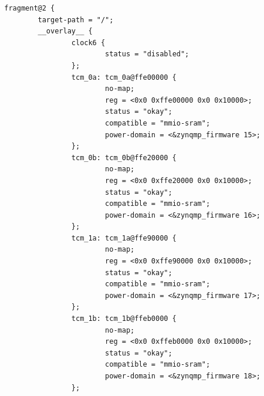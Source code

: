 \documentclass[10pt]{article}
\begin{document}
\begin{verbatim}
        fragment@2 {
                target-path = "/";
                __overlay__ {
                        clock6 {
                                status = "disabled";
                        };
                        tcm_0a: tcm_0a@ffe00000 {
                                no-map;
                                reg = <0x0 0xffe00000 0x0 0x10000>;
                                status = "okay";
                                compatible = "mmio-sram";
                                power-domain = <&zynqmp_firmware 15>;
                        };
                        tcm_0b: tcm_0b@ffe20000 {
                                no-map;
                                reg = <0x0 0xffe20000 0x0 0x10000>;
                                status = "okay";
                                compatible = "mmio-sram";
                                power-domain = <&zynqmp_firmware 16>;
                        };
                        tcm_1a: tcm_1a@ffe90000 {
                                no-map;
                                reg = <0x0 0xffe90000 0x0 0x10000>;
                                status = "okay";
                                compatible = "mmio-sram";
                                power-domain = <&zynqmp_firmware 17>;
                        };
                        tcm_1b: tcm_1b@ffeb0000 {
                                no-map;
                                reg = <0x0 0xffeb0000 0x0 0x10000>;
                                status = "okay";
                                compatible = "mmio-sram";
                                power-domain = <&zynqmp_firmware 18>;
                        };


\end{verbatim}
\end{document}
